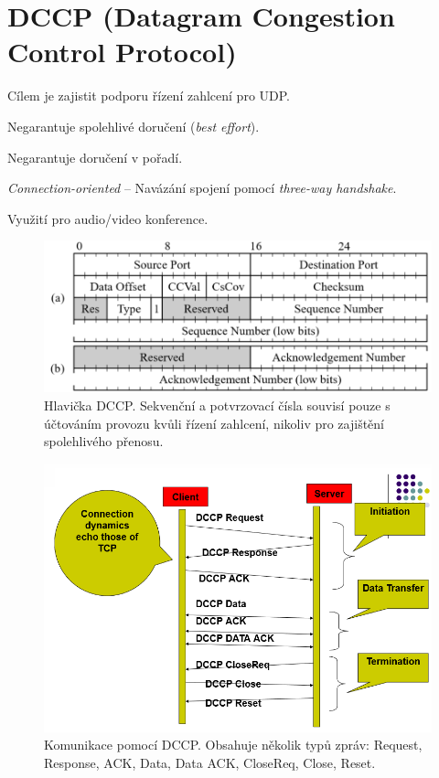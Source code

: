 
\section{DCCP (Datagram Congestion Control Protocol)}

\begin{compactitem}
    \item Cílem je zajistit podporu řízení zahlcení pro UDP.
    \item Negarantuje spolehlivé doručení (\textit{best effort}).
    \item Negarantuje doručení v pořadí.
    \item \textit{Connection-oriented} -- Navázání spojení pomocí \textit{three-way handshake}.
    \item Využití pro audio/video konference.
\end{compactitem}

\begin{figure}[H]
    \centering
    \includegraphics[width=0.75\linewidth]{dccp_header.png}
    \caption{Hlavička DCCP. Sekvenční a potvrzovací čísla souvisí pouze s účtováním provozu kvůli řízení zahlcení, nikoliv pro zajištění spolehlivého přenosu.}
\end{figure}

\begin{figure}[H]
    \centering
    \includegraphics[width=0.75\linewidth]{dccp_spojeni.png}
    \caption{Komunikace pomocí DCCP. Obsahuje několik typů zpráv: Request, Response, ACK, Data, Data ACK, CloseReq, Close, Reset.}
\end{figure}

